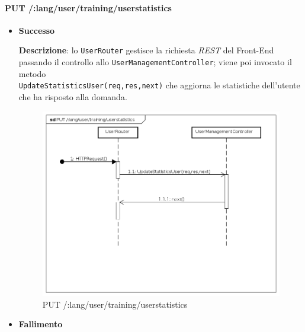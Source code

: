 \paragraph{PUT /:lang/user/training/userstatistics} %
\begin{itemize}
\item \textbf{Successo}

\textbf{Descrizione}: lo \texttt{UserRouter} gestisce la richiesta \textit{REST} del Front-End passando il controllo allo \texttt{UserManagementController}; viene poi invocato il metodo\\ \texttt{UpdateStatisticsUser(req,res,next)} che aggiorna le statistiche dell'utente che ha risposto alla domanda.

\begin{figure}[ht]
	\centering
	\includegraphics[scale=0.45]{UML/DiagrammiDiSequenza/Back-end/PUT__lang_user_training_userstatistics.png}
	\caption{PUT /:lang/user/training/userstatistics}
\end{figure}
\FloatBarrier

\item \textbf{Fallimento}
\end{itemize}




